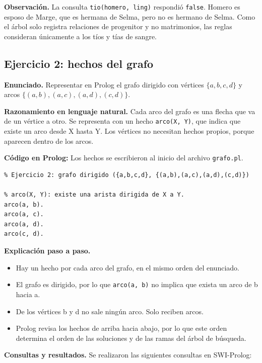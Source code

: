 \documentclass[12pt,letterpaper]{article}
\begin{document}
\noindent\textbf{Observación.} La consulta \texttt{tio(homero, ling)} respondió
\texttt{false}. Homero es esposo de Marge, que es hermana de Selma, pero no es
hermano de Selma. Como el árbol solo registra relaciones de progenitor y no
matrimonios, las reglas consideran únicamente a los tíos y tías de sangre.

\subsection{Ejercicio 2: hechos del grafo}

\noindent\textbf{Enunciado.} Representar en Prolog el grafo dirigido con vértices
$\{a, b, c, d\}$ y arcos $\{(a, b),\allowbreak (a, c),\allowbreak (a, d),\allowbreak (c, d)\}$.

\noindent\textbf{Razonamiento en lenguaje natural.} Cada arco del grafo es una flecha que va
de un vértice a otro. Se representa con un hecho \texttt{arco(X, Y)}, que indica
que existe un arco desde X hasta Y. Los vértices no necesitan hechos propios,
porque aparecen dentro de los arcos.

\noindent\textbf{Código en Prolog:} Los hechos se escribieron al inicio del archivo
\texttt{grafo.pl}.

\begin{lstlisting}
% Ejercicio 2: grafo dirigido ({a,b,c,d}, {(a,b),(a,c),(a,d),(c,d)})

% arco(X, Y): existe una arista dirigida de X a Y.
arco(a, b).
arco(a, c).
arco(a, d).
arco(c, d).
\end{lstlisting}

\noindent\textbf{Explicación paso a paso.}
\begin{itemize}
  \item Hay un hecho por cada arco del grafo, en el mismo orden del enunciado.
  \item El grafo es dirigido, por lo que \texttt{arco(a, b)} no implica que exista
  un arco de b hacia a.
  \item De los vértices b y d no sale ningún arco. Solo reciben arcos.
  \item Prolog revisa los hechos de arriba hacia abajo, por lo que este orden
  determina el orden de las soluciones y de las ramas del árbol de búsqueda.
\end{itemize}

\noindent\textbf{Consultas y resultados.} Se realizaron las siguientes consultas en
SWI-Prolog:
\end{document}
